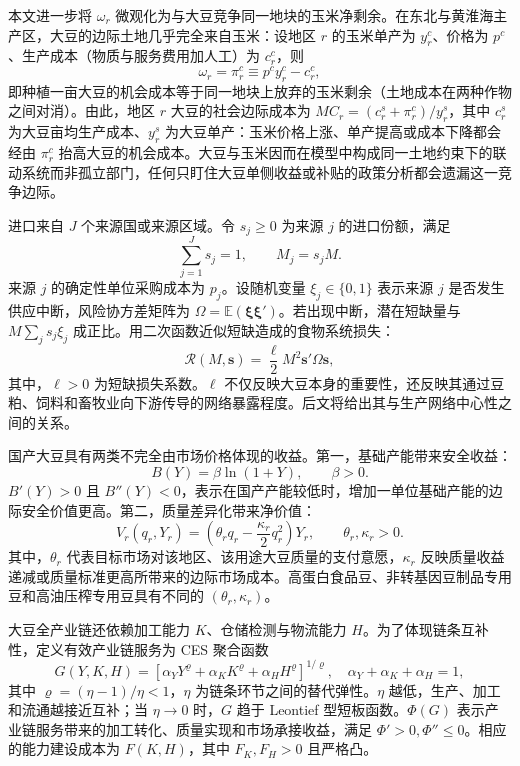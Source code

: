 \documentclass[UTF8,zihao=-4,fontset=fandol]{ctexart}
\numberwithin{equation}{section}
\theoremstyle{definition}
\theoremstyle{remark}
\newcommand{\E}{\mathbb{E}}
\begin{document}
本文进一步将 $\omega_r$ 微观化为与大豆竞争同一地块的玉米净剩余。在东北与黄淮海主产区，大豆的边际土地几乎完全来自玉米：设地区 $r$ 的玉米单产为 $y_r^c$、价格为 $p^c$、生产成本（物质与服务费用加人工）为 $c_r^c$，则
\begin{equation}
 \omega_r=\pi_r^c\equiv p^c y_r^c-c_r^c,
 \label{eq:cornopp}
\end{equation}
即种植一亩大豆的机会成本等于同一地块上放弃的玉米剩余（土地成本在两种作物之间对消）。由此，地区 $r$ 大豆的社会边际成本为 $MC_r=(c_r^s+\pi_r^c)/y_r^s$，其中 $c_r^s$ 为大豆亩均生产成本、$y_r^s$ 为大豆单产：玉米价格上涨、单产提高或成本下降都会经由 $\pi_r^c$ 抬高大豆的机会成本。大豆与玉米因而在模型中构成同一土地约束下的联动系统而非孤立部门，任何只盯住大豆单侧收益或补贴的政策分析都会遗漏这一竞争边际。

进口来自 $J$ 个来源国或来源区域。令 $s_j\geq0$ 为来源 $j$ 的进口份额，满足
\begin{equation}
 \sum_{j=1}^{J}s_j=1,\qquad M_j=s_jM.
 \label{eq:shares}
\end{equation}
来源 $j$ 的确定性单位采购成本为 $p_j$。设随机变量 $\xi_j\in\{0,1\}$ 表示来源 $j$ 是否发生供应中断，风险协方差矩阵为 $\Omega=\E(\bm\xi\bm\xi')$。若出现中断，潜在短缺量与 $M\sum_js_j\xi_j$ 成正比。用二次函数近似短缺造成的食物系统损失：
\begin{equation}
 \mathcal{R}(M,\bm s)=\frac{\ell}{2}M^2\bm s'\Omega\bm s,
 \label{eq:risk}
\end{equation}
其中，$\ell>0$ 为短缺损失系数。$\ell$ 不仅反映大豆本身的重要性，还反映其通过豆粕、饲料和畜牧业向下游传导的网络暴露程度。后文将给出其与生产网络中心性之间的关系。

国产大豆具有两类不完全由市场价格体现的收益。第一，基础产能带来安全收益：
\begin{equation}
 B(Y)=\beta\ln(1+Y),\qquad \beta>0.
 \label{eq:safetybenefit}
\end{equation}
$B'(Y)>0$ 且 $B''(Y)<0$，表示在国产产能较低时，增加一单位基础产能的边际安全价值更高。第二，质量差异化带来净价值：
\begin{equation}
 V_r(q_r,Y_r)=\left(\theta_r q_r-\frac{\kappa_r}{2}q_r^2\right)Y_r,
 \qquad \theta_r,\kappa_r>0.
 \label{eq:qualityvalue}
\end{equation}
其中，$\theta_r$ 代表目标市场对该地区、该用途大豆质量的支付意愿，$\kappa_r$ 反映质量收益递减或质量标准更高所带来的边际市场成本。高蛋白食品豆、非转基因豆制品专用豆和高油压榨专用豆具有不同的 $(\theta_r,\kappa_r)$。

大豆全产业链还依赖加工能力 $K$、仓储检测与物流能力 $H$。为了体现链条互补性，定义有效产业链服务为 CES 聚合函数
\begin{equation}
 G(Y,K,H)=\left[\alpha_Y Y^{\varrho}+\alpha_K K^{\varrho}+\alpha_H H^{\varrho}\right]^{1/\varrho},
 \quad \alpha_Y+\alpha_K+\alpha_H=1,
 \label{eq:ceschain}
\end{equation}
其中 $\varrho=(\eta-1)/\eta<1$，$\eta$ 为链条环节之间的替代弹性。$\eta$ 越低，生产、加工和流通越接近互补；当 $\eta\rightarrow0$ 时，$G$ 趋于 Leontief 型短板函数。$\Phi(G)$ 表示产业链服务带来的加工转化、质量实现和市场承接收益，满足 $\Phi'>0,\Phi''\leq0$。相应的能力建设成本为 $F(K,H)$，其中 $F_K,F_H>0$ 且严格凸。
\end{document}

